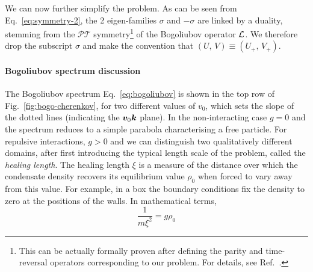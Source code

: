We can now further simplify the problem. As can be seen from
Eq.~\eqref{eq:symmetry-2}, the 2 eigen-families $\sigma$ and $-\sigma$
are linked by a duality, stemming from the $\mathcal{P} \mathcal{T}$
symmetry\footnote{This can be actually formally proven after defining
  the parity and time-reversal operators corresponding to our
  problem. For details, see Ref.~\cite{MOSTAFAZADEH_2010}.} of the
Bogoliubov operator $\mathcal{L}$.  We therefore drop the subscript $\sigma$
and make the convention that
$\left( U,\, V \right) \equiv \left( U_{+},\, V_{+} \right)$.

\paragraph{Bogoliubov spectrum discussion}
The Bogoliubov spectrum Eq.~\eqref{eq:bogoliubov} is shown in the top
row of Fig.~\ref{fig:bogo-cherenkov}, for two different values of
$v_0$, which sets the slope of the dotted lines (indicating the
$\bm{v}_0 \bm{k}$ plane). In the non-interacting case $g=0$ and the
spectrum reduces to a simple parabola characterising a free
particle. For repulsive interactions, $g > 0$ and we can distinguish
two qualitatively different domains, after first introducing the
typical length scale of the problem, called the \textit{healing
  length}. The healing length $\xi$ is a measure of the distance over
which the condensate density recovers its equilibrium value $\rho_0$
when forced to vary away from this value. For example, in a box the
boundary conditions fix the density to zero at the positions of the
walls. In mathematical terms,
%
\begin{equation}\label{eq:healing-length}
  \frac{1}{m\xi^2}=g\rho_0
\end{equation}
% 

